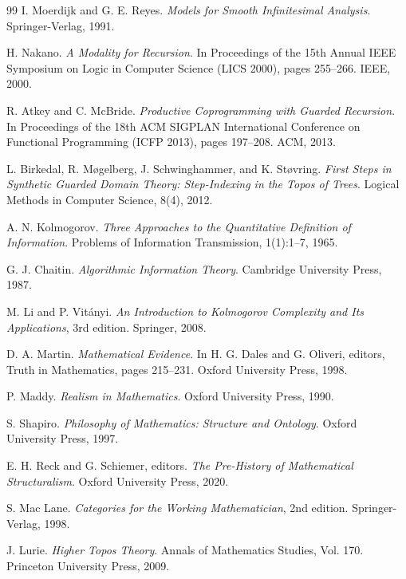 \documentclass[11pt]{article}
\theoremstyle{definition}
\begin{document}
\begin{thebibliography}{99}
I. Moerdijk and G. E. Reyes.
\textit{Models for Smooth Infinitesimal Analysis}.
Springer-Verlag, 1991.

H. Nakano.
\textit{A Modality for Recursion}.
In Proceedings of the 15th Annual IEEE Symposium on Logic in Computer Science (LICS 2000), pages 255--266. IEEE, 2000.

R. Atkey and C. McBride.
\textit{Productive Coprogramming with Guarded Recursion}.
In Proceedings of the 18th ACM SIGPLAN International Conference on Functional Programming (ICFP 2013), pages 197--208. ACM, 2013.

L. Birkedal, R. Møgelberg, J. Schwinghammer, and K. Støvring.
\textit{First Steps in Synthetic Guarded Domain Theory: Step-Indexing in the Topos of Trees}.
Logical Methods in Computer Science, 8(4), 2012.

A. N. Kolmogorov.
\textit{Three Approaches to the Quantitative Definition of Information}.
Problems of Information Transmission, 1(1):1--7, 1965.

G. J. Chaitin.
\textit{Algorithmic Information Theory}.
Cambridge University Press, 1987.

M. Li and P. Vitányi.
\textit{An Introduction to Kolmogorov Complexity and Its Applications}, 3rd edition.
Springer, 2008.

D. A. Martin.
\textit{Mathematical Evidence}.
In H. G. Dales and G. Oliveri, editors, Truth in Mathematics, pages 215--231. Oxford University Press, 1998.

P. Maddy.
\textit{Realism in Mathematics}.
Oxford University Press, 1990.

S. Shapiro.
\textit{Philosophy of Mathematics: Structure and Ontology}.
Oxford University Press, 1997.

E. H. Reck and G. Schiemer, editors.
\textit{The Pre-History of Mathematical Structuralism}.
Oxford University Press, 2020.

S. Mac Lane.
\textit{Categories for the Working Mathematician}, 2nd edition.
Springer-Verlag, 1998.

J. Lurie.
\textit{Higher Topos Theory}.
Annals of Mathematics Studies, Vol. 170. Princeton University Press, 2009.


\end{thebibliography}
\end{document}
